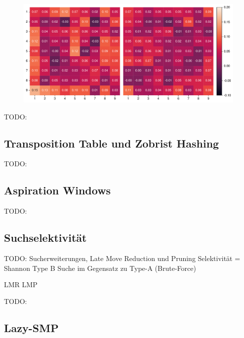 \begin{figure}[!ht]
    \centering
    \begin{minipage}{.78\textwidth}
        \centering
        \includegraphics[width=\linewidth]{res/pictures/plots/special-action-ordering.pdf}
    \end{minipage}
    \label{fig:action-ordering-special-patch}
\end{figure}

TODO:

\subsection{Transposition Table und Zobrist Hashing}

TODO:

\subsection{Aspiration Windows}

TODO:

\cite{2003.AspirationWindows}
\cite{2024.StockfishBackoff}

\subsection{Suchselektivität}

TODO: Sucherweiterungen, Late Move Reduction und Pruning
Selektivität = Shannon Type B Suche \cite{1950.ChessShannon} im Gegensatz zu Type-A (Brute-Force)


\ac{LMR} \cite{2007.LMR}
\ac{LMP} \cite{2023.StockfishTerminology}

TODO:

\subsection{Lazy-SMP}

